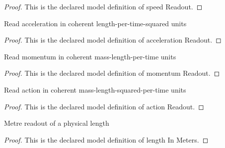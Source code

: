 \begin{proof}
  This is the declared model definition of speed Readout.
\end{proof}
\begin{definition}
  \label{def:physics:phyx-mini-0507:phyxminiproblems-problemphyxmini0507-accelerationreadout}
  Read acceleration in coherent length-per-time-squared units
\end{definition}
\begin{proof}
  This is the declared model definition of acceleration Readout.
\end{proof}
\begin{definition}
  \label{def:physics:phyx-mini-0507:phyxminiproblems-problemphyxmini0507-momentumreadout}
  Read momentum in coherent mass-length-per-time units
\end{definition}
\begin{proof}
  This is the declared model definition of momentum Readout.
\end{proof}
\begin{definition}
  \label{def:physics:phyx-mini-0507:phyxminiproblems-problemphyxmini0507-actionreadout}
  Read action in coherent mass-length-squared-per-time units
\end{definition}
\begin{proof}
  This is the declared model definition of action Readout.
\end{proof}
\begin{definition}
  \label{def:physics:phyx-mini-0507:phyxminiproblems-problemphyxmini0507-lengthinmeters}
  Metre readout of a physical length
\end{definition}
\begin{proof}
  This is the declared model definition of length In Meters.
\end{proof}
